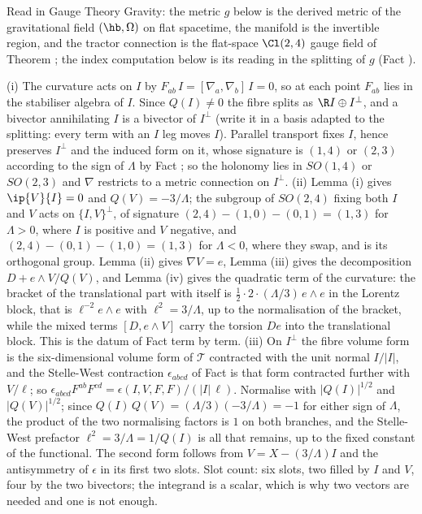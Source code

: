Read in Gauge Theory Gravity: the metric $g$ below is the derived metric of the gravitational field $(\hb, \Omega)$ on flat spacetime, the manifold is the invertible region, and the tractor connection is the flat-space $\Cl(2,4)$ gauge field of Theorem ; the index computation below is its reading in the splitting of $g$ (Fact ).

(i) The curvature acts on $I$ by $F_{ab}\,I = [\nabla_a, \nabla_b]\,I = 0$, so at each point $F_{ab}$ lies in the stabiliser algebra of $I$. Since $Q(I) \neq 0$ the fibre splits as $\R I \oplus I^\perp$, and a bivector annihilating $I$ is a bivector of $I^\perp$ (write it in a basis adapted to the splitting: every term with an $I$ leg moves $I$). Parallel transport fixes $I$, hence preserves $I^\perp$ and the induced form on it, whose signature is $(1,4)$ or $(2,3)$ according to the sign of $\Lambda$ by Fact ; so the holonomy lies in $SO(1,4)$ or $SO(2,3)$ and $\nabla$ restricts to a metric connection on $I^\perp$.
(ii) Lemma (i) gives $\ip{V}{I} = 0$ and $Q(V) = -3/\Lambda$; the subgroup of $SO(2,4)$ fixing both $I$ and $V$ acts on $\{I,V\}^\perp$, of signature $(2,4) - (1,0) - (0,1) = (1,3)$ for $\Lambda > 0$, where $I$ is positive and $V$ negative, and $(2,4) - (0,1) - (1,0) = (1,3)$ for $\Lambda < 0$, where they swap, and is its orthogonal group. Lemma (ii) gives $\nabla V = e$, Lemma (iii) gives the decomposition $D + e\wedge V/Q(V)$, and Lemma (iv) gives the quadratic term of the curvature: the bracket of the translational part with itself is $\tfrac12\cdot 2\cdot(\Lambda/3)\,e\wedge e$ in the Lorentz block, that is $\ell^{-2}e\wedge e$ with $\ell^2 = 3/\Lambda$, up to the normalisation of the bracket, while the mixed terms $[D, e\wedge V]$ carry the torsion $De$ into the translational block. This is the datum of Fact  term by term.
(iii) On $I^\perp$ the fibre volume form is the six-dimensional volume form of $\mathcal{T}$ contracted with the unit normal $I/|I|$, and the Stelle-West contraction $\epsilon_{abcd}$ of Fact  is that form contracted further with $V/\ell$; so $\epsilon_{abcd}F^{ab}F^{cd} = \epsilon(I, V, F, F)/(|I|\,\ell)$. Normalise with $|Q(I)|^{1/2}$ and $|Q(V)|^{1/2}$; since $Q(I)\,Q(V) = (\Lambda/3)(-3/\Lambda) = -1$ for either sign of $\Lambda$, the product of the two normalising factors is $1$ on both branches, and the Stelle-West prefactor $\ell^2 = 3/\Lambda = 1/Q(I)$ is all that remains, up to the fixed constant of the functional. The second form follows from $V = X - (3/\Lambda)I$ and the antisymmetry of $\epsilon$ in its first two slots. Slot count: six slots, two filled by $I$ and $V$, four by the two bivectors; the integrand is a scalar, which is why two vectors are needed and one is not enough.
